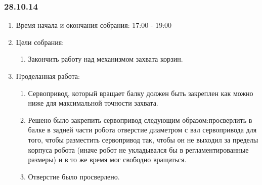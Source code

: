 
\subsubsection{28.10.14}

\begin{enumerate}
	\item Время начала и окончания собрания:
	17:00 - 19:00
	\item Цели собрания:
	\begin{enumerate}
	  \item Закончить работу над механизмом захвата корзин.
	  
    \end{enumerate}
    
	\item Проделанная работа:
	\begin{enumerate}
	  \item Сервопривод, который вращает балку должен быть закреплен как можно ниже для максимальной точности захвата.
      
      \item Решено было закрепить сервопривод следующим образом:просверлить в балке в задней части робота отверстие диаметром с вал сервопривода для того, чтобы разместить сервопривод так, чтобы он не выходил за пределы корпуса робота (иначе робот не укладывался бы в регламентированные размеры) и в то же время мог свободно вращаться.
      
      \item Отверстие было просверлено.
      

\end{enumerate}
\end{enumerate}
